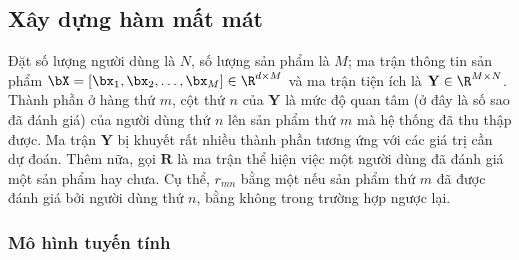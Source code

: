 \subsection{Xây dựng hàm mất mát}

Đặt số lượng người dùng là $N$, số lượng sản phẩm là $M$; ma
trận thông tin sản phẩm $\bX = [\bx_1, \bx_2, \dots, \bx_M] \in\R^{d\times M}$ và ma
trận tiện ích là $\mathbf{Y} \in \R^{M \times N}$. Thành phần ở hàng thứ $m$, cột
thứ $n$ của $\mathbf{Y}$ là {mức độ quan tâm} (ở đây là số sao đã
đánh giá) của người dùng thứ $n$ lên sản phẩm thứ $m$ mà hệ thống
đã thu
thập được. Ma trận $\mathbf{Y}$ bị khuyết rất nhiều thành phần tương ứng với các
giá trị cần dự đoán. Thêm nữa, gọi $\mathbf{R}$ là ma trận thể hiện việc một người dùng đã đánh giá một
sản phẩm hay chưa. Cụ thể, $r_{mn}$ bằng một nếu sản phẩm thứ $m$ đã
được đánh giá bởi người dùng thứ $n$, bằng không trong trường hợp ngược
lại.

\subsubsection{Mô hình tuyến tính}

